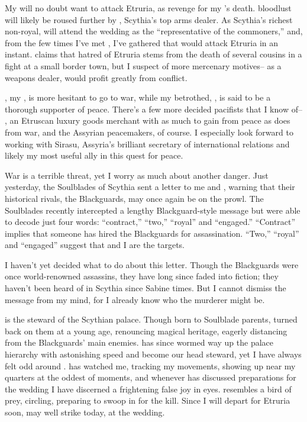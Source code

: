 \documentclass[char]{Kos}
\begin{document}
My \cScythiaQueen{\parent} will no doubt want to attack Etruria, as revenge for my \cFugitive{\sibling}'s death. \cScythiaQueen{\Their} bloodlust will likely be roused further by \cArmsDealer{}, Scythia's top arms dealer. As Scythia's richest non-royal, \cArmsDealer{} will attend the wedding as the ``representative of the commoners,'' and, from the few times I've met \cArmsDealer{\them}, I've gathered that \cArmsDealer{\they} would attack Etruria in an instant. \cArmsDealer{\They} claims that \cArmsDealer{\their} hatred of Etruria stems from the death of several cousins in a fight at a small border town, but I suspect \cArmsDealer{\them} of more mercenary motives-- as a weapons dealer, \cArmsDealer{} would profit greatly from conflict. 

\cScythiaKing{}, my \cScythiaKing{\parent}, is more hesitant to go to war, while my betrothed, \cGroom{}, is said to be a thorough supporter of peace. There's a few more decided pacifists that I know of-- \cMerchant{}, an Etruscan luxury goods merchant with as much to gain from peace as \cArmsDealer{} does from war, and the Assyrian peacemakers, of course. I especially look forward to working with Sirasu, Assyria's brilliant secretary of international relations and likely my most useful ally in this quest for peace.

War is a terrible threat, yet I worry as much about another danger. Just yesterday, the Soulblades of Scythia sent a letter to me and \cGroom{}, warning that their historical rivals, the Blackguards, may once again be on the prowl. The Soulblades recently intercepted a lengthy Blackguard-style message but were able to decode just four words: ``contract,'' ``two,'' ``royal'' and ``engaged.'' ``Contract'' implies that someone has hired the Blackguards for assassination. ``Two,'' ``royal'' and ``engaged'' suggest that \cGroom{} and I are the targets.

I haven't yet decided what to do about this letter. Though the Blackguards were once world-renowned assassins, they have long since faded into fiction; they haven't been heard of in Scythia since Sabine times. But I cannot dismiss the message from my mind, for I already know who the murderer might be.

\cButler{} is the steward of the Scythian palace. Though born to Soulblade parents, \cButler{\they} turned \cButler{\their} back on them at a young age, renouncing \cButler{\their} magical heritage, eagerly distancing \cButler{\themself} from the Blackguards' main enemies. \cButler{\They} has since wormed \cButler{\their} way up the palace hierarchy with astonishing speed and become our head steward, yet I have always felt odd around \cButler{\them}. \cButler{} has watched me, tracking my movements, showing up near my quarters at the oddest of moments, and whenever \cButler{\they} has discussed preparations for the wedding I have discerned a frightening false joy in \cButler{\their} eyes. \cButler{\They} resembles a bird of prey, circling, preparing to swoop in for the kill. Since I will depart for Etruria soon, \cButler{\they} may well strike today, at the wedding.
\end{document}
